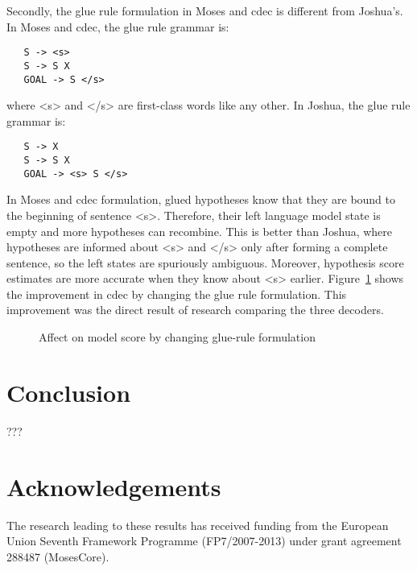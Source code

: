\documentclass{pbml}
\begin{document}
Secondly, the glue rule formulation in Moses and cdec is different from Joshua's. In Moses and cdec, the glue rule grammar is:
\begin{verbatim}
   S -> <s>
   S -> S X
   GOAL -> S </s> 
\end{verbatim}
where <s> and </s> are first-class words like any other. In Joshua, the glue rule grammar is:
\begin{verbatim}
   S -> X
   S -> S X
   GOAL -> <s> S </s> 
\end{verbatim}
In Moses and cdec formulation, glued hypotheses know that they are bound to the beginning of sentence <s>.  Therefore, their left language model state is empty and more hypotheses can recombine.  This is better than Joshua, where hypotheses are informed about <s> and </s> only after forming a complete sentence, so the left states are spuriously ambiguous.  Moreover, hypothesis score estimates are more accurate when they know about <s> earlier. Figure~\ref{fig:glue} shows the improvement in cdec by changing the glue rule formulation. This improvement was the direct result of research comparing the three decoders.

\begin{figure}[h]
\begin{center}

\end{center}
\caption{Affect on model score by changing glue-rule formulation}
\label{fig:glue}
\end{figure}

\section{Conclusion}

???

\section*{Acknowledgements}

The research leading to these results has received funding from the European Union Seventh Framework Programme (FP7/2007-2013) under grant agreement 288487 (MosesCore).




\correspondingaddress
\end{document}
